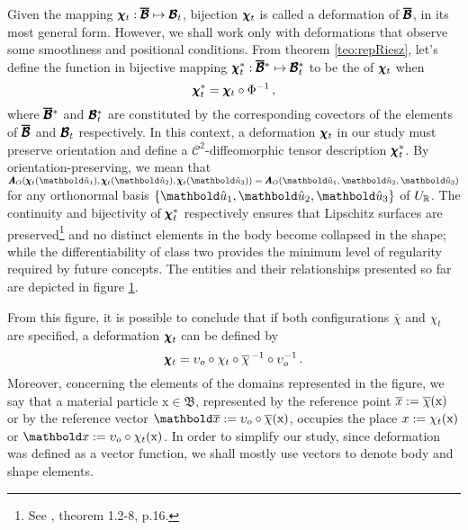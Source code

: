 Given the mapping $\pmb{\chi}_t : \pmb{\overline{\mathcal{B}}} \mapsto \pmb{\mathcal{B}}_t$, bijection $\pmb{\chi}_t$ is called a deformation of $\pmb{\overline{\mathcal{B}}}$, in its most general form. However, we shall work only with deformations that observe some smoothness and positional conditions. From theorem \ref{teo:repRiesz}, let's define the function in bijective mapping $\pmb{\chi}_t^* : \pmb{\overline{\mathcal{B}}}^* \mapsto \pmb{\mathcal{B}}_t^*$ to be the  of $\pmb{\chi}_t$ when
\begin{equation}
\pmb{\chi}_t^* = \pmb{\chi}_t\circ\Phi^{-1}\,,
\end{equation} 
 where $\pmb{\overline{\mathcal{B}}}^*$ and $\pmb{\mathcal{B}}_t^*$ are constituted by the corresponding covectors of the elements of $\pmb{\overline{\mathcal{B}}}$ and $\pmb{\mathcal{B}}_t$ respectively. In this context, a deformation $\pmb{\chi}_t$ in our study must preserve orientation and define a $\mathcal{C}^{2}$-diffeomorphic tensor description $\pmb{\chi}_t^*$. By orientation-preserving, we mean that $\fua{\tnr{A}_O}{\fua{\tnr{\chi}_t}{\vun{u}_1},\fua{\tnr{\chi}_t}{\vun{u}_2},\fua{\tnr{\chi}_t}{\vun{u}_3}}=\fua{\tnr{A}_O}{\vun{u}_1,\vun{u}_2,\vun{u}_3}$ for any orthonormal basis $\{\vun{u}_1,\vun{u}_2,\vun{u}_3\}$ of $U_{\mathbb{R}}$. The continuity and bijectivity of $\pmb{\chi}_t^*$ respectively ensures that Lipschitz surfaces are preserved\footnote{See \cite{ciarlet_1988_2_2}, theorem 1.2-8, p.16.} and no distinct elements in the body become collapsed in the shape; while the differentiability of class two provides the minimum level of regularity required by future concepts. The entities and their relationships presented so far are depicted in figure \ref{fg:deformacao}. 
\begin{figure}[!ht]
\centering
\begin{center}
\scalebox{.72}{}
\end{center}
\label{fg:deformacao}
\end{figure}
From this figure, it is possible to conclude that if both configurations $\overline{\chi}$ and $\chi_t$ are specified, a deformation $\pmb{\chi}_t$ can be defined by 
\begin{equation}
\pmb{\chi}_t = \upsilon_o\circ\chi_t\circ\overline{\chi}^{\,-1}\circ\upsilon_o^{-1}\,.
\end{equation}
Moreover, concerning the elements of the domains represented in the figure, we say that a material particle $\text{x}\in\mathfrak{B}$, represented by the reference point $\overline{x}:=\overline{\chi}(\text{x})$ or by the reference vector $\vto{\overline{x}}:=\fua{\upsilon_o\circ\overline{\chi}}{\text{x}}$, occupies the place $x:=\chi_t(\text{x})$ or $\vto{x}:=\fua{\upsilon_o\circ\chi_t}{\text{x}}$. In order to simplify our study, since deformation was defined as a vector function, we shall mostly use vectors to denote body and shape elements.  


